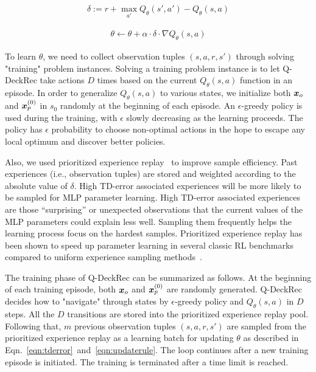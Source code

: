 \begin{align}
\delta := r + \max_{a'} Q_{\theta}(s', a') - Q_{\theta}(s,a)
\label{eqn:tderror}
\end{align}

\begin{align}
\theta \leftarrow \theta + \alpha \cdot \delta \cdot \nabla Q_\theta(s,a)
\label{eqn:updaterule}
\end{align}

To learn $\theta$, we need to collect  observation tuples $(s,a,r,s')$ through solving "training" problem instances. Solving a training problem instance is to let Q-DeckRec take actions $D$ times based on the current $Q_\theta(s,a)$ function in an episode. In order to generalize $Q_\theta(s,a)$ to various states, we initialize both $\boldsymbol{x}_o$ and $\boldsymbol{x}_p^{(0)}$ in $s_0$ randomly at the beginning of each episode. An $\epsilon$-greedy policy is used during the training, with $\epsilon$ slowly decreasing as the learning proceeds. The policy has $\epsilon$ probability to choose non-optimal actions in the hope to escape any local optimum and discover better policies. 

Also, we used prioritized experience replay~\citep{schaul2015prioritized} to improve sample efficiency. Past experiences (i.e., observation tuples) are stored and weighted according to the absolute value of $\delta$. High TD-error associated experiences will be more likely to be sampled for MLP parameter learning. High TD-error associated experiences are those ``surprising'' or unexpected observations that the current values of the MLP parameters could explain less well. Sampling them frequently helps the learning process focus on the hardest samples. Prioritized experience replay has been shown to speed up parameter learning in several classic RL benchmarks compared to uniform experience sampling methods~\citep{schaul2015prioritized}.  

The training phase of Q-DeckRec can be summarized as follows. At the beginning of each training episode, both $\boldsymbol{x}_o$ and $\boldsymbol{x}_p^{(0)}$ are randomly generated. Q-DeckRec decides how to "navigate" through states by $\epsilon$-greedy policy and $Q_\theta(s,a)$ in $D$ steps. All the $D$ transitions are stored into the prioritized experience replay pool. Following that, $m$ previous observation tuples $(s, a, r, s')$ are sampled from the prioritized experience replay as a learning batch for updating $\theta$ as described in Eqn.~\ref{eqn:tderror}~and~\ref{eqn:updaterule}. The loop continues after a new training episode is initiated. The training is terminated after a time limit is reached. 


